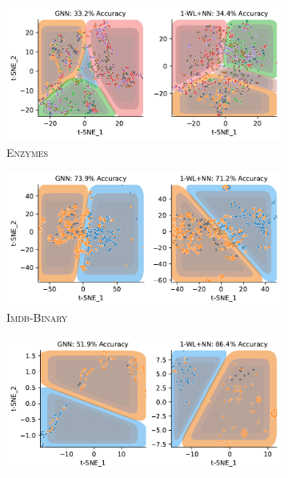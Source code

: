 \begin{figure}[H]
	\begin{subfigure}[b]{0.49\textwidth}
		\centering
		\includegraphics[width=\textwidth]{Figures/tsne_svm_lin_ENZYMES.pdf}
		\vspace*{-4ex} 
		\caption{\textsc{Enzymes}}
	\end{subfigure}
	\hfill
	\begin{subfigure}[b]{0.49\textwidth}
		\centering
		\includegraphics[width=\textwidth]{Figures/tsne_svm_lin_IMDB.pdf}
		\vspace*{-4ex} 
		\caption{\textsc{Imdb-Binary}}
	\end{subfigure}
	\par\bigskip
	\begin{subfigure}[b]{0.49\textwidth}
		\centering
		\includegraphics[width=\textwidth]{Figures/tsne_svm_lin_MUTAG.pdf}

\end{subfigure}
\end{figure}
